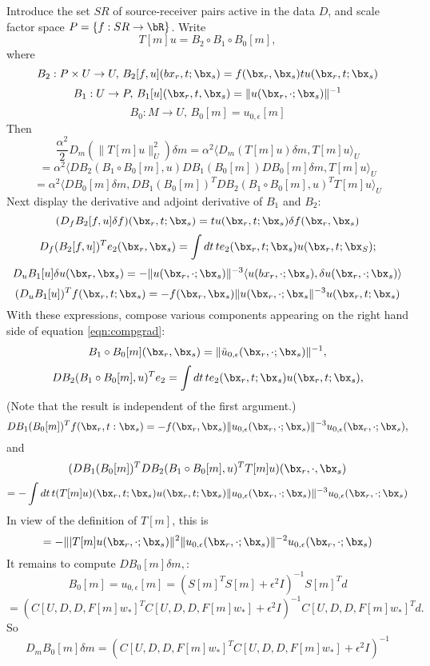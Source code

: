 Introduce the set $SR$ of source-receiver pairs active in the data
$D$, and scale factor space $P = \{f:SR \rightarrow \bR\}$. Write
\[
  T[m]u = B_2 \circ B_1 \circ B_0[m],
\]
where 
\[
B_2: P \times U \rightarrow U, \, B_2[f,u](bx_r,t;\bx_s) = f(\bx_r,\bx_s) tu(\bx_r,t;\bx_s)
\]
\[
B_1: U \rightarrow P, \,B_1[u](\bx_r,t,\bx_s) = \|u(\bx_r,\cdot; \bx_s)\|^{-1}
\]
\[
B_0: M \rightarrow U, \, B_0[m] = u_{0,\epsilon}[m]
\]
Then
\[
 \frac{\alpha^2}{2} D_m(\|T[m]u\|_U^2)\delta m = \alpha^2\langle D_m(
 T[m]u)\delta m, T[m]u \rangle_U
\]
\[
  =\alpha^2 \langle DB_2(B_1\circ B_0[m],u)DB_1(B_0[m]) DB_0[m]\delta m,
  T[m]u\rangle_U
\]
\begin{equation}
  \label{eqn:compgrad}
  =\alpha^2 \langle DB_0[m]\delta m, DB_1(B_0[m])^TDB_2(B_1\circ
  B_0[m],u)^TT[m]u\rangle_U
\end{equation}
Next display the derivative and adjoint derivative of $B_1$ and $B_2$:
$$
(D_fB_2[f,u]\delta f)(\bx_r,t;\bx_s) = tu(\bx_r,t;\bx_s)\delta f(\bx_r,\bx_s)
$$
$$
D_f(B_2[f,u])^Te_2(\bx_r,\bx_s) = \int dt\,te_2(\bx_r,t;\bx_s)u(\bx_r,t;\bx_S);
$$
$$
D_u B_1[u]\delta u(\bx_r,\bx_s) = -\|u(\bx_r,\cdot;\bx_s)\|^{-3}\langle u(bx_r,\cdot;\bx_s), \delta u(\bx_r,\cdot;\bx_s) \rangle
$$
$$
(D_u B_1[u])^Tf(\bx_r,t;\bx_s) =
-f(\bx_r,\bx_s)\|u(\bx_r,\cdot;\bx_s\|^{-3}u(\bx_r,t;\bx_s)
$$
With these expressions, compose various components appearing on the
right hand side of equation \ref{eqn:compgrad}:
\[
  B_1\circ B_0[m] (\bx_r,\bx_s) =  \|\tilde{u}_{0,\epsilon}(\bx_r,\cdot; \bx_s)\|^{-1},
\]
\[
 DB_2(B_1\circ B_0[m],u)^Te_2 = \int dt\,te_2(\bx_r,t;\bx_s)u(\bx_r,t;\bx_s),
\]
(Note that the result is independent of the first argument.)
\[
DB_1(B_0[m])^Tf(\bx_r,t:\bx_s)=
-f(\bx_r,\bx_s)\|u_{0,\epsilon}(\bx_r,\cdot;\bx_s)\|^{-3}u_{0,\epsilon}(\bx_r,\cdot;\bx_s),
\]
and
\[
  (DB_1(B_0[m])^TDB_2(B_1\circ  B_0[m],u)^TT[m]u )(\bx_r,\cdot,\bx_s)
\]
\[
  = -\int dt\,t(T[m]u)(\bx_r,t;\bx_s)u(\bx_r,t;\bx_s)
  \|u_{0,\epsilon}(\bx_r,\cdot;\bx_s)\|^{-3}u_{0,\epsilon}(\bx_r,\cdot;\bx_s)
\]
In view of the definition of $T[m]$, this is
\begin{equation}
  \label{eqn:compgrad1}
  = -\||T[m]u(\bx_r,\cdot;\bx_s)\|^2
  \|u_{0,\epsilon}(\bx_r,\cdot;\bx_s)\|^{-2}u_{0,\epsilon}(\bx_r,\cdot;\bx_s)
\end{equation}
It remains to compute $ DB_0[m]\delta m,$:
$$
B_0[m] = u_{0,\epsilon}[m] = (S[m]^TS[m] + \epsilon^2 I)^{-1}S[m]^Td
$$
$$
= (C[U,D,D,F[m]w_*]^TC[U,D,D,F[m]w_*] + \epsilon^2 I)^{-1}C[U,D,D,F[m]w_*]^Td.
$$
So
$$
D_mB_0[m]\delta m = (C[U,D,D,F[m]w_*]^TC[U,D,D,F[m]w_*] + \epsilon^2 I)^{-1}
$$
